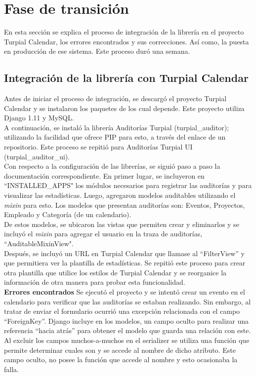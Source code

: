 \section{Fase de transición}

En esta sección se explica el proceso de integración de la librería en el proyecto Turpial Calendar, los errores encontrados y sus correcciones. Así como, la puesta en producción de ese sistema. Este proceso duró una semana.

\subsection{Integración de la librería con Turpial Calendar}

Antes de iniciar el proceso de integración, se descargó el proyecto Turpial Calendar y se instalaron los paquetes de los cual depende. Este proyecto utiliza Django 1.11 y MySQL. \\

A continuación, se instaló la librería Auditorías Turpial (turpial\_auditor); utilizando la facilidad que ofrece PIP para esto, a través del enlace de un repositorio. Este proceso se repitió para Auditorías Turpial UI (turpial\_auditor\_ui).\\

Con respecto a la configuración de las librerías, se siguió paso a paso la documentación correspondiente. En primer lugar, se incluyeron en “INSTALLED\_APPS" los módulos necesarios para registrar las auditorías y para visualizar las estadísticas. Luego, agregaron modelos auditables utilizando el \textit{mixin} para esto. Los modelos que presentan auditorías son: Eventos, Proyectos, Empleado y Categoría (de un calendario).\\

De estos modelos, se ubicaron las vistas que permiten crear y eliminarlos y se incluyó el \textit{mixin} para agregar el usuario en la traza de auditorías, “AuditableMixinView".\\

Después, se incluyó un URL en Turpial Calendar que llamase al “FilterView” y que permitiera ver la plantilla de estadísticas. Se repitió este proceso para crear otra plantilla que utilice los estilos de Turpial Calendar y se reorganice la información de otra manera para probar esta funcionalidad.\\

\textbf{Errores encontrados}  Se ejecutó el proyecto y se intentó crear un evento en el calendario para verificar que las auditorías se estaban realizando. Sin embargo, al tratar de enviar el formulario ocurrió una excepción relacionada con el campo “ForeignKey”. Django incluye en los modelos, un campo oculto para realizar una referencia “hacia atrás” para obtener el modelo que guarda una relación con este. Al excluir los campos muchos-a-muchos en el serializer se utiliza una función que permite determinar cuales son y se accede al nombre de dicho atributo. Este campo oculto, no posee la función que accede al nombre y esto ocasionaba la falla.\\

